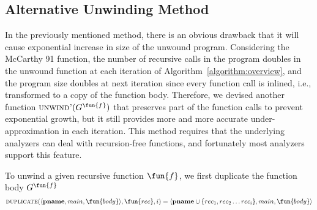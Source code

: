 \subsection{Alternative Unwinding Method}\label{subsec:new-unwinding}
In the previously mentioned method, there is an obvious drawback that it will
cause exponential increase in size of the unwound program.
Considering the McCarthy 91 function, the number of recursive calls in the
program doubles in the unwound function at each iteration of 
Algorithm~\ref{algorithm:overview},
and the program size doubles at next iteration since every function call is
inlined, i.e., transformed to a copy of the function body.
Therefore, we devised another function $\textsc{unwind'}(G^\fun{f})$ that
preserves part of the function calls to prevent exponential growth, 
but it still provides more and more accurate under-approximation in each
iteration.
This method requires that the underlying analyzers can deal with
recursion-free functions, and fortunately most analyzers support this feature.

To unwind a given recursive function $\fun{f}$, we first duplicate the function body
$G^\fun{f}$
\begin{equation*}
  \textsc{duplicate}(\langle \mathbf{pname},main,\fun{body}\rangle, \fun{rec},i)
    = \langle \mathbf{pname}\cup\{rec_1, rec_2\dotsc rec_i\},main,\fun{body}\rangle
\end{equation*}
